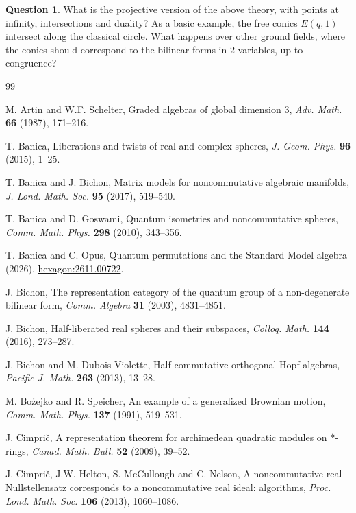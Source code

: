 \documentclass[11pt]{amsart}
\theoremstyle{definition}
\newtheorem{question}[theorem]{Question}
\begin{document}
\begin{question}
What is the projective version of the above theory, with points at infinity, intersections and duality? As a basic example, the free conics $E(q,1)$ intersect along the classical circle. What happens over other ground fields, where the conics should correspond to the bilinear forms in $2$ variables, up to congruence?
\end{question}

\begin{thebibliography}{99}

 M. Artin and W.F. Schelter, Graded algebras of global dimension 3, {\em Adv. Math.} {\bf 66} (1987), 171--216.

 T. Banica, Liberations and twists of real and complex spheres, {\em J. Geom. Phys.} {\bf 96} (2015), 1--25.

 T. Banica and J. Bichon, Matrix models for noncommutative algebraic manifolds, {\em J. Lond. Math. Soc.} {\bf 95} (2017), 519--540.

 T. Banica and D. Goswami, Quantum isometries and noncommutative spheres, {\em Comm. Math. Phys.} {\bf 298} (2010), 343--356.

 T. Banica and C. Opus, Quantum permutations and the Standard Model algebra (2026), \href{https://hexagonmath.org/2611.00722v1}{\textcolor{black}{\mbox{hexagon:2611.00722}}}.

 J. Bichon, The representation category of the quantum group of a non-degenerate bilinear form, {\em Comm. Algebra} {\bf 31} (2003), 4831--4851.

 J. Bichon, Half-liberated real spheres and their subspaces, {\em Colloq. Math.} {\bf 144} (2016), 273--287.

 J. Bichon and M. Dubois-Violette, Half-commutative orthogonal Hopf algebras, {\em Pacific J. Math.} {\bf 263} (2013), 13--28.

 M. Bo\.zejko and R. Speicher, An example of a generalized Brownian motion, {\em Comm. Math. Phys.} {\bf 137} (1991), 519--531.

 J. Cimpri\v c, A representation theorem for archimedean quadratic modules on $*$-rings, {\em Canad. Math. Bull.} {\bf 52} (2009), 39--52.

 J. Cimpri\v c, J.W. Helton, S. McCullough and C. Nelson, A noncommutative real Nullstellensatz corresponds to a noncommutative real ideal: algorithms, {\em Proc. Lond. Math. Soc.} {\bf 106} (2013), 1060--1086.


\end{thebibliography}
\end{document}
